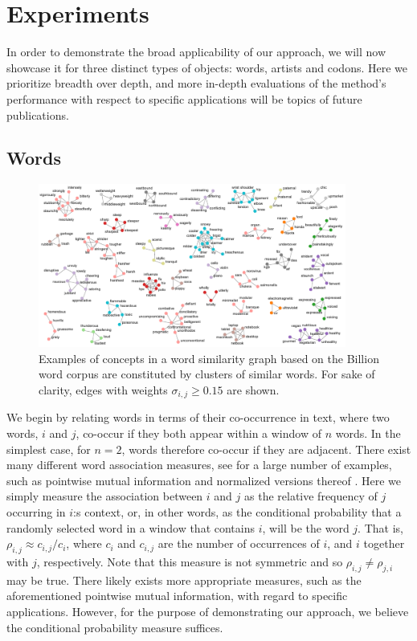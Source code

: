 \documentclass[conference]{IEEEtran}
\newcommand{\rn}[1]{\rho_{#1}}
\newcommand{\sy}[1]{\sigma_{#1}}
\begin{document}
\section{Experiments}
\label{sec:experiments}

In order to demonstrate the broad applicability of our approach, we will now showcase it for three distinct 
types of objects: words, artists and codons. Here we prioritize breadth over depth, and more in-depth evaluations 
of the method's performance with respect to specific applications will be topics of future publications.

\subsection{Words}
\label{subsec:words}

\begin{figure}
\begin{center}
\includegraphics[width=0.9\textwidth]{figures/billion-words-example.pdf}
\end{center}
\caption{Examples of concepts in a word similarity graph based on the Billion word corpus are constituted by clusters 
of similar words. For sake of clarity, edges with weights $\sy{i,j} \geq 0.15$ are shown.}
\label{fig:billion-words-example}
\end{figure}

We begin by relating words in terms of their co-occurrence in text, where two words, $i$ and $j$, co-occur if they both
appear within a window of $n$ words. In the simplest case, for $n = 2$, words therefore co-occur if they are adjacent.
There exist many different word association measures, see \cite{Pecina08} for a large number of examples, such as
pointwise mutual information \cite{Church90} and normalized versions thereof \cite{Bouma09}. Here we simply measure the
association between $i$ and $j$ as the relative frequency of $j$ occurring in $i$:s context, or, in other words, as the
conditional probability that a randomly selected word in a window that contains $i$, will be the word $j$. That is, $\rn{i,j}
\approx c_{i,j}/{c_i}$, where $c_i$ and $c_{i,j}$ are the number of occurrences of $i$, and $i$ together with $j$,
respectively. Note that this measure is not symmetric and so $\rn{i,j} \neq \rn{j,i}$ may be true. There likely exists more
appropriate measures, such as the aforementioned pointwise mutual information, with regard to specific applications.
However, for the purpose of demonstrating our approach, we believe the conditional probability measure suffices.
\end{document}
